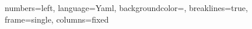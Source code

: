 
\newcommand{\paragraphl}[1]{\paragraph{#1}\mbox{}\\} 

\renewcommand\lstlistlistingname{Listák jegyzéke}

\usepackage{amssymb}%
\usepackage{pifont}%
\newcommand{\cmark}{\ding{51}}%
\newcommand{\xmark}{\ding{55}}%

 {
	numbers=left,
	language=Yaml,
	backgroundcolor={\color{lightgray!40}},
	breaklines=true,
	frame=single,
	columns=fixed
}
